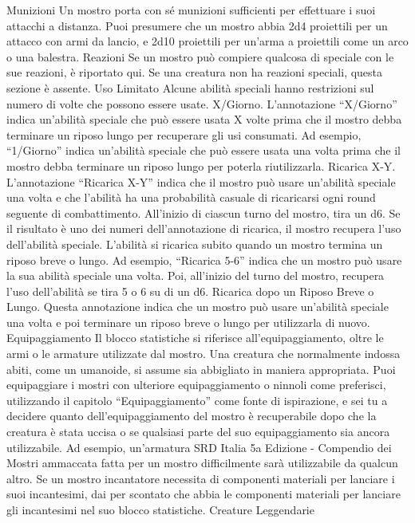 \begin{multicols}{2}
Munizioni
Un mostro porta con sé munizioni sufficienti per
effettuare i suoi attacchi a distanza. Puoi presumere
che un mostro abbia 2d4 proiettili per un attacco con
armi da lancio, e 2d10 proiettili per un’arma a proiettili
come un arco o una balestra.
Reazioni
Se un mostro può compiere qualcosa di speciale con le
sue reazioni, è riportato qui. Se una creatura non ha
reazioni speciali, questa sezione è assente.
Uso Limitato
Alcune abilità speciali hanno restrizioni sul numero di
volte che possono essere usate.
X/Giorno. L’annotazione “X/Giorno” indica un’abilità
speciale che può essere usata X volte prima che il
mostro debba terminare un riposo lungo per recuperare
gli usi consumati. Ad esempio, “1/Giorno” indica
un’abilità speciale che può essere usata una volta
prima che il mostro debba terminare un riposo lungo
per poterla riutilizzarla.
Ricarica X-Y. L’annotazione “Ricarica X-Y” indica che il
mostro può usare un’abilità speciale una volta e che
l’abilità ha una probabilità casuale di ricaricarsi ogni round
seguente di combattimento. All’inizio di ciascun turno del
mostro, tira un d6. Se il risultato è uno dei numeri
dell’annotazione di ricarica, il mostro recupera l’uso
dell’abilità speciale. L’abilità si ricarica subito quando un
mostro termina un riposo breve o lungo.
Ad esempio, “Ricarica 5-6” indica che un mostro può
usare la sua abilità speciale una volta. Poi, all’inizio del
turno del mostro, recupera l’uso dell’abilità se tira 5 o 6 su
di un d6.
Ricarica dopo un Riposo Breve o Lungo. Questa
annotazione indica che un mostro può usare un’abilità
speciale una volta e poi terminare un riposo breve o
lungo per utilizzarla di nuovo.
Equipaggiamento
Il blocco statistiche si riferisce all’equipaggiamento,
oltre le armi o le armature utilizzate dal mostro. Una
creatura che normalmente indossa abiti, come un
umanoide, si assume sia abbigliato in maniera
appropriata.
Puoi equipaggiare i mostri con ulteriore
equipaggiamento o ninnoli come preferisci, utilizzando il
capitolo “Equipaggiamento” come fonte di ispirazione, e
sei tu a decidere quanto dell’equipaggiamento del
mostro è recuperabile dopo che la creatura è stata
uccisa o se qualsiasi parte del suo equipaggiamento sia
ancora utilizzabile. Ad esempio, un’armatura 
SRD Italia 5a Edizione - Compendio dei Mostri
ammaccata fatta per un mostro difficilmente sarà
utilizzabile da qualcun altro.
Se un mostro incantatore necessita di componenti
materiali per lanciare i suoi incantesimi, dai per
scontato che abbia le componenti materiali per lanciare
gli incantesimi nel suo blocco statistiche.
Creature Leggendarie

\end{multicols}
